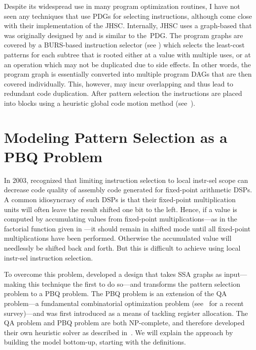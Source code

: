 Despite its widespread use in many \gls{program} optimization routines, I have
not seen any techniques that use \glspl{PDG} for selecting \glspl{instruction},
although \textcite{Paleczny2001} come close with their implementation of the
\gls{JHSC}.
%
Internally, \gls{JHSC} uses a \gls{graph}-based \tIRformat that was
originally designed by \textcite{Click1995a} and is similar to
the~\gls{PDG}.
%
The \glspl{program graph} are covered by a \gls{BURS}-based
\gls{instruction selector} (see )
which selects the least-cost \glspl{pattern} for each \gls{subtree} that is
rooted either at a value with multiple uses, or at an operation which may not be
duplicated due to \glspl{side effect}.
%
In other words, the \gls{program graph}
is essentially converted into multiple \glspl{program DAG} that are then covered
individually.
%
This, however, may incur overlapping and thus lead to redundant
code duplication.
%
After \gls{pattern selection} the \glspl{instruction} are
placed into \glspl{block} using a heuristic \gls{global code motion} method
(see~\cite{Click1995b}).


\section{Modeling Pattern Selection as a PBQ Problem}

In 2003, \textcite{Eckstein2003} recognized that limiting \gls{instruction
  selection} to \gls{local instr-sel} scope can decrease code quality of
\gls{assembly code} generated for fixed-point arithmetic \glsdesc{DSP}s.
%
A
common idiosyncrasy of such \glspl{DSP} is that their fixed-point multiplication
units will often leave the result shifted one bit to the left.
%
Hence, if a value
is computed by accumulating values from fixed-point multiplications---as in the
factorial \gls{function} given in \unskip%
---it should remain in shifted mode until all fixed-point multiplications have
been performed.
%
Otherwise the accumulated value will needlessly be shifted back
and forth.
%
But this is difficult to achieve using \gls{local instr-sel}
\gls{instruction selection}.

To overcome this problem, \citeauthor{Eckstein2003} developed a design that
takes \glspl{SSA graph} as input---making this technique the first to do
so---and transforms the \gls{pattern selection} problem to a \gls{PBQ
  problem}.
%
The \gls{PBQ problem} is an extension of the \gls{QA problem}---a
fundamental combinatorial optimization problem (see~\cite{Loiola2007} for a
recent survey)---and was first introduced \textcite{Scholz2002} as a means of
tackling \gls{register allocation}.
%
The \gls{QA problem} and \gls{PBQ problem}
are both NP-complete, and \citeauthor{Eckstein2003} therefore developed
their own heuristic solver as described in~\cite{Eckstein2003}.
%
We will explain
the  approach by building the model bottom-up, starting
with the definitions.

